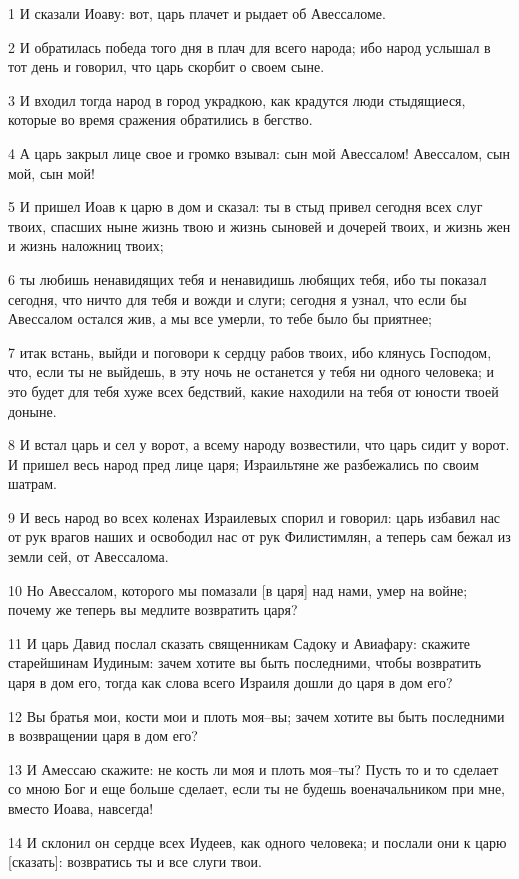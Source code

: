 \par 1 И сказали Иоаву: вот, царь плачет и рыдает об Авессаломе.
\par 2 И обратилась победа того дня в плач для всего народа; ибо народ услышал в тот день и говорил, что царь скорбит о своем сыне.
\par 3 И входил тогда народ в город украдкою, как крадутся люди стыдящиеся, которые во время сражения обратились в бегство.
\par 4 А царь закрыл лице свое и громко взывал: сын мой Авессалом! Авессалом, сын мой, сын мой!
\par 5 И пришел Иоав к царю в дом и сказал: ты в стыд привел сегодня всех слуг твоих, спасших ныне жизнь твою и жизнь сыновей и дочерей твоих, и жизнь жен и жизнь наложниц твоих;
\par 6 ты любишь ненавидящих тебя и ненавидишь любящих тебя, ибо ты показал сегодня, что ничто для тебя и вожди и слуги; сегодня я узнал, что если бы Авессалом остался жив, а мы все умерли, то тебе было бы приятнее;
\par 7 итак встань, выйди и поговори к сердцу рабов твоих, ибо клянусь Господом, что, если ты не выйдешь, в эту ночь не останется у тебя ни одного человека; и это будет для тебя хуже всех бедствий, какие находили на тебя от юности твоей доныне.
\par 8 И встал царь и сел у ворот, а всему народу возвестили, что царь сидит у ворот. И пришел весь народ пред лице царя; Израильтяне же разбежались по своим шатрам.
\par 9 И весь народ во всех коленах Израилевых спорил и говорил: царь избавил нас от рук врагов наших и освободил нас от рук Филистимлян, а теперь сам бежал из земли сей, от Авессалома.
\par 10 Но Авессалом, которого мы помазали [в царя] над нами, умер на войне; почему же теперь вы медлите возвратить царя?
\par 11 И царь Давид послал сказать священникам Садоку и Авиафару: скажите старейшинам Иудиным: зачем хотите вы быть последними, чтобы возвратить царя в дом его, тогда как слова всего Израиля дошли до царя в дом его?
\par 12 Вы братья мои, кости мои и плоть моя--вы; зачем хотите вы быть последними в возвращении царя в дом его?
\par 13 И Амессаю скажите: не кость ли моя и плоть моя--ты? Пусть то и то сделает со мною Бог и еще больше сделает, если ты не будешь военачальником при мне, вместо Иоава, навсегда!
\par 14 И склонил он сердце всех Иудеев, как одного человека; и послали они к царю [сказать]: возвратись ты и все слуги твои.
